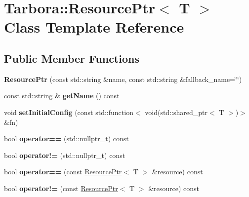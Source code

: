 \hypertarget{classTarbora_1_1ResourcePtr}{}\section{Tarbora\+:\+:Resource\+Ptr$<$ T $>$ Class Template Reference}
\label{classTarbora_1_1ResourcePtr}
\subsection*{Public Member Functions}
\begin{DoxyCompactItemize}
\item 
\mbox{\label{classTarbora_1_1ResourcePtr_a919aa53a998157893d108ec2ada9760c}} 
{\bfseries Resource\+Ptr} (const std\+::string \&name, const std\+::string \&fallback\+\_\+name=\char`\"{}\char`\"{})
\item 
\mbox{\label{classTarbora_1_1ResourcePtr_a353b2547d9d4076e8a6832f057162cee}} 
const std\+::string \& {\bfseries get\+Name} () const
\item 
\mbox{\label{classTarbora_1_1ResourcePtr_a535e5fdc30454b68d381fd8f85f6ff46}} 
void {\bfseries set\+Initial\+Config} (const std\+::function$<$ void(std\+::shared\+\_\+ptr$<$ T $>$)$>$ \&fn)
\item 
\mbox{\label{classTarbora_1_1ResourcePtr_aa7749a1dc3d7ce82eb8a7376ef414112}} 
bool {\bfseries operator==} (std\+::nullptr\+\_\+t) const
\item 
\mbox{\label{classTarbora_1_1ResourcePtr_a7b7d255e86f4d6215458e30505ac2458}} 
bool {\bfseries operator!=} (std\+::nullptr\+\_\+t) const
\item 
\mbox{\label{classTarbora_1_1ResourcePtr_a505d23b4f28e13c378507a0417720ec0}} 
bool {\bfseries operator==} (const \hyperlink{classTarbora_1_1ResourcePtr}{Resource\+Ptr}$<$ T $>$ \&resource) const
\item 
\mbox{\label{classTarbora_1_1ResourcePtr_a7b9984dc9b099fe54417249b8396b460}} 
bool {\bfseries operator!=} (const \hyperlink{classTarbora_1_1ResourcePtr}{Resource\+Ptr}$<$ T $>$ \&resource) const

\end{DoxyCompactItemize}
